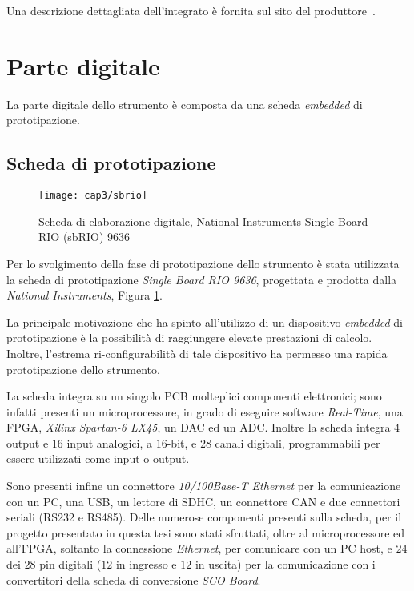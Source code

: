 Una descrizione dettagliata dell'integrato è fornita sul sito del produttore~\cite{siteads807}.

\section{Parte digitale}
La parte digitale dello strumento è composta da una scheda \textit{embedded} di prototipazione. 

\subsection{Scheda di prototipazione}
\begin{figure}  
  \begin{center}
    \texttt{[image: cap3/sbrio]}
    \caption{Scheda di elaborazione digitale, National Instruments Single-Board RIO (sbRIO) 9636}
    \label{sbrio}
  \end{center}
\end{figure}
Per lo svolgimento della fase di prototipazione dello strumento è stata utilizzata la scheda di prototipazione \textit{Single Board RIO 9636}, progettata e prodotta dalla \textit{National Instruments}, Figura \ref{sbrio}.

La principale motivazione che ha spinto all'utilizzo di un dispositivo \textit{embedded} di prototipazione è la possibilità di raggiungere elevate prestazioni di calcolo. Inoltre, l'estrema ri-configurabilità di tale dispositivo ha permesso una rapida prototipazione dello strumento.

La scheda integra su un singolo PCB molteplici componenti elettronici; sono infatti presenti un microprocessore, in grado di eseguire software \textit{Real-Time}, una FPGA, \textit{Xilinx Spartan-6 LX45}, un DAC ed un ADC. Inoltre la scheda integra $4$ output e $16$ input analogici, a $16$-bit, e $28$ canali digitali, programmabili per essere utilizzati come input o output.

Sono presenti infine un connettore \textit{10/100Base-T Ethernet} per la comunicazione con un PC, una USB, un lettore di SDHC, un connettore CAN e due connettori seriali (RS232 e RS485). Delle numerose componenti presenti sulla scheda, per il progetto presentato in questa tesi sono stati sfruttati, oltre al microprocessore ed all'FPGA, soltanto la connessione \textit{Ethernet}, per comunicare con un PC host, e $24$ dei $28$ pin digitali ($12$ in ingresso e $12$ in uscita) per la comunicazione con i convertitori della scheda di conversione \textit{SCO Board}.

